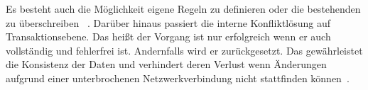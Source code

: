 Es besteht auch die Möglichkeit eigene Regeln zu definieren oder die bestehenden zu überschreiben ~\cite{realm_conflict}.
Darüber hinaus passiert die interne Konfliktlösung auf Transaktionsebene. Das heißt der Vorgang ist nur erfolgreich wenn er auch vollständig und fehlerfrei ist. Andernfalls wird er zurückgesetzt.
Das gewährleistet die Konsistenz der Daten und verhindert deren Verlust wenn Änderungen aufgrund einer unterbrochenen Netzwerkverbindung nicht stattfinden können~\cite{realm_offline_whitepaper}.